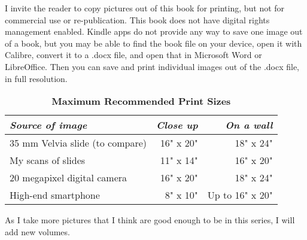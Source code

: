 I invite the reader to copy pictures out of this book for printing, but not for commercial use or re-publication. This book does not have digital rights management enabled. Kindle apps do not provide any way to save one image out of a book, but you may be able to find the book file on your device, open it with Calibre, convert it to a .docx file, and open that in Microsoft Word or LibreOffice. Then you can save and print individual images out of the .docx file, in full resolution.

\begin{table}
\centering
\captionsetup{labelformat=empty}
\caption{\textbf{Maximum Recommended Print Sizes}}
\begin{tabular}{lrr}
\hline
\emph{Source of image}                                  & \emph{Close up} & \emph{On a wall} \\
\hline
35 mm Velvia slide (to compare) & 16" x 20" & 18" x 24" \\
My scans of slides                            & 11" x 14"  & 16" x 20"  \\
20 megapixel digital camera             & 16" x 20"  & 18" x 24"  \\
High-end smartphone                      & 8" x 10"   & Up to 16" x 20"  \\
\hline
\end{tabular}
\end{table}

As I take more pictures that I think are good enough to be in this series, I will add new volumes.
